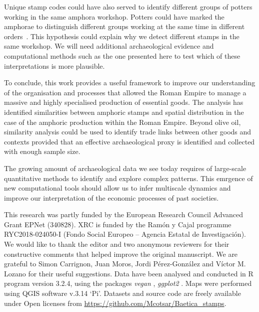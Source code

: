 Unique stamp codes could have also served to identify different groups of potters working in the same amphora workshop. Potters could have marked the amphorae to distinguish different groups working at the same time in different orders~\citep{li_crossbows_2014}. This hypothesis could explain why we detect different stamps in the same workshop. We will need additional archaeological evidence and computational methods such as the one presented here to test which of these interpretations is more plausible.

To conclude, this work provides a useful framework to improve our understanding of the organisation and processes that allowed the Roman Empire to manage a massive and highly specialised production of essential goods. The analysis has identified similarities between amphoric stamps and spatial distribution in the case of the amphoric production within the Roman Empire. Beyond olive oil, similarity analysis could be used to identify trade links between other goods and contexts provided that an effective archaeological proxy is identified and collected with enough sample size.

The growing amount of archaeological data we see today requires of large-scale quantitative methods to identify and explore complex patterns. This emrgence of new computational tools should allow us to infer multiscale dynamics and improve our interpretation of the economic processes of past societies. 



\begin{acknowledgements}

This research was partly funded by the European Research Council Advanced Grant EPNet (340828). XRC is funded by the Ram\'on y Cajal programme RYC2018-024050-I (Fondo Social Europeo – Agencia Estatal de Investigaci\'on). We would like to thank the editor and two anonymous reviewers for their constructive comments that helped improve the original manuscript. We are grateful to Simon Carrignon, Juan Moros, Jordi P\'erez-Gonz\'alez and V\'ictor M. Lozano for their useful suggestions.  
Data have been analysed and conducted in R program version 3.2.4, using the packages \textit{vegan} \citep{oksanen_vegan_2007}, \textit{ggplot2} \citep{ggplot2:_2016}. Maps were performed using QGIS software v.3.14 `Pi'. Datasets and source code are freely available under Open licenses from \url{https://github.com/Mcotsar/Baetica\_stamps}.

\end{acknowledgements}




